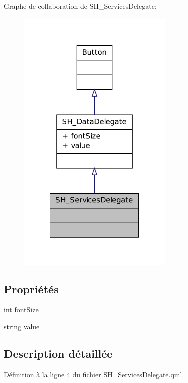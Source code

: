 Graphe de collaboration de S\-H\-\_\-\-Services\-Delegate\-:\nopagebreak
\begin{figure}[H]
\begin{center}
\leavevmode
\includegraphics[width=212pt]{classSH__ServicesDelegate__coll__graph}
\end{center}
\end{figure}
\subsection*{Propriétés}
\begin{DoxyCompactItemize}
\item 
int \hyperlink{classSH__DataDelegate_afbb41ad9b513c7f27e7b5ad90d82e95b}{font\-Size}
\item 
string \hyperlink{classSH__DataDelegate_acb9da3c73493c88865e08d9575f26482}{value}
\end{DoxyCompactItemize}


\subsection{Description détaillée}


Définition à la ligne \hyperlink{SH__ServicesDelegate_8qml_source_l00004}{4} du fichier \hyperlink{SH__ServicesDelegate_8qml_source}{S\-H\-\_\-\-Services\-Delegate.\-qml}.



